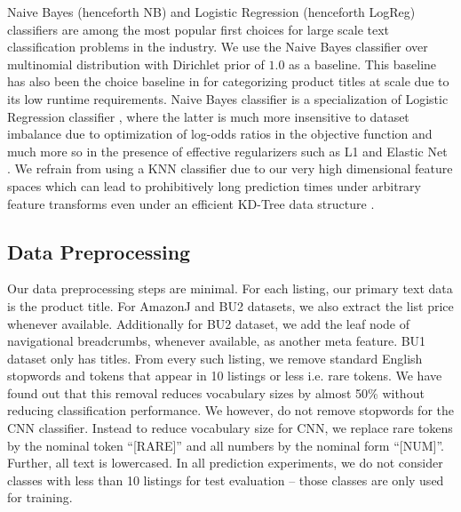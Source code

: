 \vspace{-0.1cm}

Naive Bayes (henceforth NB) and Logistic Regression (henceforth LogReg) classifiers are among the most popular first choices for large scale text classification problems in the industry.
We use the Naive Bayes classifier over multinomial distribution with Dirichlet prior of $1.0$ as a baseline.
This baseline has also been the choice baseline in \cite{Shen12, Sun14} for categorizing product titles at scale due to its low runtime requirements.
Naive Bayes classifier is a specialization of Logistic Regression classifier \cite{Ng01}, where the latter is much more insensitive to dataset imbalance due to optimization of log-odds ratios in the objective function and much more so in the presence of effective regularizers such as L1 and Elastic Net \cite{ESL03, Zhang04:SGD, Zou05:EN}.
We refrain from using a KNN classifier due to our very high dimensional feature spaces which can lead to prohibitively long prediction times under arbitrary feature transforms even under an efficient KD-Tree data structure \cite{Manning08:IR}.

\vspace{-0.2cm}
\subsection{Data Preprocessing}
\label{Subsect:Data-preprocessing}
\vspace{-0.2cm}

Our data preprocessing steps are minimal.
For each listing, our primary text data is the product title. 
For AmazonJ and BU2 datasets, we also extract the list price whenever available. 
Additionally for BU2 dataset, we add the leaf node of navigational breadcrumbs, whenever available, as another meta feature.
BU1 dataset only has titles.
From every such listing, we remove standard English stopwords and tokens that appear in 10 listings or less i.e. rare tokens. 
We have found out that this removal reduces vocabulary sizes by almost 50\% without reducing classification performance.
We however, do not remove stopwords for the CNN classifier.
Instead to reduce vocabulary size for CNN, we replace rare tokens by the nominal token ``[RARE]'' and all numbers by the nominal form ``[NUM]''.
Further, all text is lowercased.
In all prediction experiments, we do not consider classes with less than 10 listings for test evaluation -- those classes are only used for training.

\vspace{-0.1cm}
